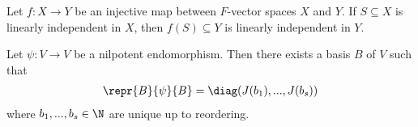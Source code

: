 \documentclass{article}
\begin{document}
\begin{lemma}[Lemma 6.3.7]
	Let $f:X\to Y$ be an injective map between $F$-vector spaces $X$ and $Y$. If $S\subseteq X$
	is linearly independent in $X$, then $f(S)\subseteq Y$ is linearly independent in $Y$.
\end{lemma}

\begin{lemma}[Exercise 91]
	Let $\psi:V\to V$ be a nilpotent endomorphism. Then there exists a basis $B$ of $V$ such that
	\begin{align*}
		\repr{B}{\psi}{B}=\diag(J(b_1),...,J(b_s))
	\end{align*}
	where $b_1,...,b_s\in\N$ are unique up to reordering.
\end{lemma}
\end{document}
